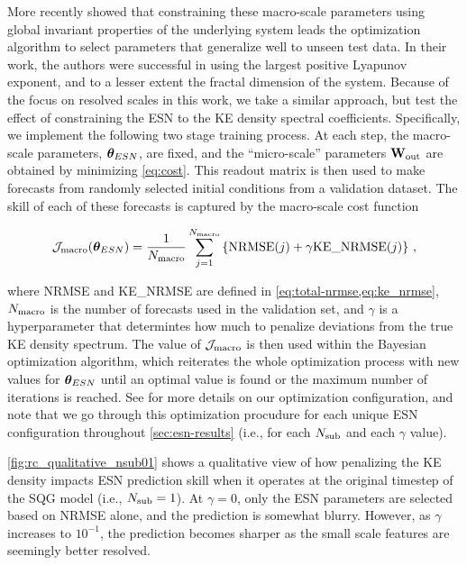 More recently  showed that constraining these macro-scale
parameters using global invariant properties of the underlying system leads the
optimization algorithm to select parameters that generalize well to unseen test
data.
In their work, the authors were successful in using the largest positive
Lyapunov exponent, and to a lesser extent the fractal dimension of the system.
Because of the focus on resolved scales in this work, we take a similar
approach, but test the effect of constraining the ESN to the KE density
spectral coefficients.
Specifically, we implement the following two stage training process.
At each step, the macro-scale parameters, $\bm{\theta}_{ESN}$, are fixed, and the
``micro-scale'' parameters $\mathbf{W}_\text{out}$ are obtained by minimizing \cref{eq:cost}.
This readout matrix is then used to make forecasts from randomly selected
initial conditions from a validation dataset.
The skill of each of these forecasts is captured by the macro-scale cost
function
\begin{linenomath*}\begin{equation}
    \mathcal{J}_\text{macro}(\bm{\theta}_{ESN}) = \dfrac{1}{N_\text{macro}}
    \sum_{j=1}^{N_\text{macro}}
    \left\{
        \text{NRMSE}(j) + \gamma \text{KE\_NRMSE}(j)
    \right\}
    \label{eq:macro-cost} \, ,
\end{equation}\end{linenomath*}
where NRMSE and KE\_NRMSE are defined in \cref{eq:total-nrmse,eq:ke_nrmse},
$N_\text{macro}$ is the number of forecasts used in the validation set, and $\gamma$ is
a hyperparameter that determintes how much to penalize deviations
from the true KE density spectrum.
The value of $\mathcal{J}_\text{macro}$ is then used within the Bayesian optimization
algorithm, which reiterates the whole optimization process with new values for
$\bm{\theta}_{ESN}$ until an optimal value is found or the maximum number of
iterations is reached.
See  for more details on our optimization configuration, and
note that we go through this optimization procudure for each unique ESN configuration
throughout \cref{sec:esn-results} (i.e., for each $N_\text{sub}$ and each $\gamma$
value).

\cref{fig:rc_qualitative_nsub01} shows a qualitative view of how penalizing the
KE density impacts ESN prediction skill when it operates at the original
timestep of the SQG model (i.e., $N_\text{sub}=1$).
At $\gamma=0$, only the ESN parameters are selected based on NRMSE alone, and
the prediction is somewhat blurry.
However, as $\gamma$ increases to $10^{-1}$, the prediction becomes sharper as
the small scale features are seemingly better resolved.

